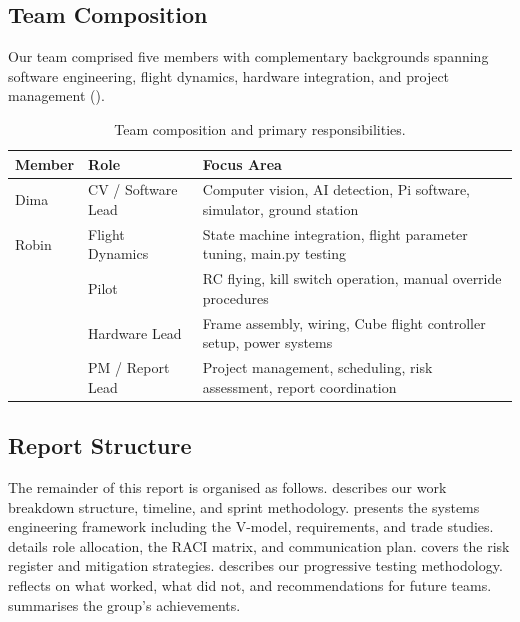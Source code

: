 \subsection{Team Composition}

Our team comprised five members with complementary backgrounds spanning software engineering, flight dynamics, hardware integration, and project management ().

\begin{table}[htbp]
\centering
\compactTable
\caption{Team composition and primary responsibilities.}
\label{tab:team}
\begin{tabularx}{\linewidth}{l l X}
\toprule
\textbf{Member} & \textbf{Role} & \textbf{Focus Area} \\
\midrule
Dima & CV / Software Lead & Computer vision, AI detection, Pi software, simulator, ground station \\
Robin & Flight Dynamics & State machine integration, flight parameter tuning, main.py testing \\
[Member 3] & Pilot & RC flying, kill switch operation, manual override procedures \\
[Member 4] & Hardware Lead & Frame assembly, wiring, Cube flight controller setup, power systems \\
[Member 5] & PM / Report Lead & Project management, scheduling, risk assessment, report coordination \\
\bottomrule
\end{tabularx}
\end{table}

\subsection{Report Structure}

The remainder of this report is organised as follows.  describes our work breakdown structure, timeline, and sprint methodology.  presents the systems engineering framework including the V-model, requirements, and trade studies.  details role allocation, the RACI matrix, and communication plan.  covers the risk register and mitigation strategies.  describes our progressive testing methodology.  reflects on what worked, what did not, and recommendations for future teams.  summarises the group's achievements.
